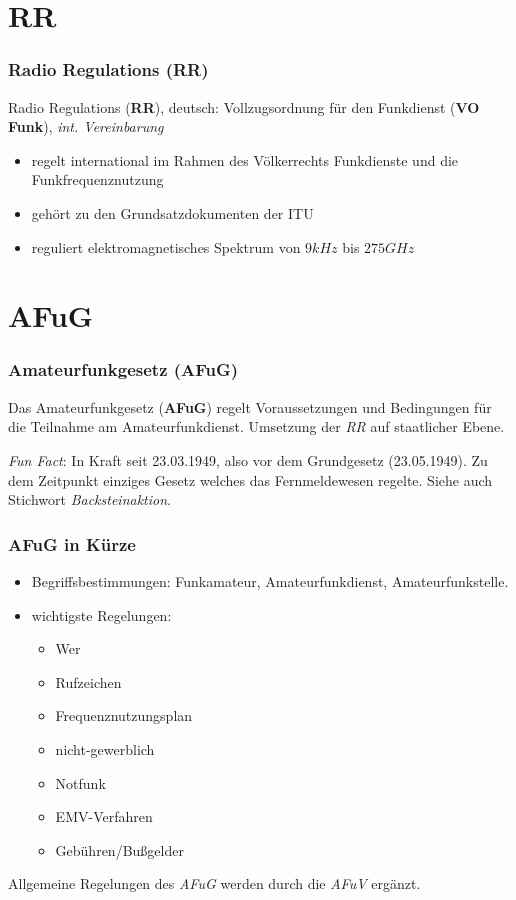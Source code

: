\section{RR}

\begin{frame}
  \frametitle{Radio Regulations (RR)}

  Radio Regulations (\textbf{RR}), deutsch: Vollzugsordnung für den Funkdienst
  (\textbf{VO Funk}), \emph{int. Vereinbarung}

  \begin{itemize}
    \item regelt international im Rahmen des Völkerrechts Funkdienste und
      die Funkfrequenznutzung
    \item gehört zu den Grundsatzdokumenten der ITU
    \item reguliert elektromagnetisches Spektrum von $9kHz$ bis $275GHz$
  \end{itemize}

\end{frame}

\section{AFuG}

\begin{frame}
  \frametitle{Amateurfunkgesetz (AFuG)}

  Das Amateurfunkgesetz (\textbf{AFuG}) regelt Voraussetzungen und Bedingungen
  für die Teilnahme am Amateurfunkdienst. Umsetzung der \emph{RR} auf
  staatlicher Ebene.

  \vspace{2em}
  \emph{Fun Fact}: In Kraft seit 23.03.1949, also vor dem Grundgesetz
  (23.05.1949). Zu dem Zeitpunkt einziges Gesetz welches das Fernmeldewesen
  regelte. Siehe auch Stichwort \emph{Backsteinaktion}.

\end{frame}

\begin{frame}
  \frametitle{AFuG in Kürze}

  \begin{itemize}
    \item Begriffsbestimmungen: Funkamateur, Amateurfunkdienst,
      Amateurfunkstelle.
    \item wichtigste Regelungen:
      \begin{itemize}
        \item Wer
        \item Rufzeichen
        \item Frequenznutzungsplan
        \item nicht-gewerblich
        \item Notfunk
        \item EMV-Verfahren
        \item Gebühren/Bußgelder
      \end{itemize}
  \end{itemize}

  Allgemeine Regelungen des \emph{AFuG} werden durch die \emph{AFuV} ergänzt.

\end{frame}

